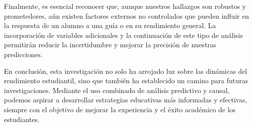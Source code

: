 Finalmente, es esencial reconocer que, aunque nuestros hallazgos son robustos y prometedores, aún existen factores externos no controlados que pueden influir en la respuesta de un alumno a una guía o en su rendimiento general. La incorporación de variables adicionales y la continuación de este tipo de análisis permitirán reducir la incertidumbre y mejorar la precisión de nuestras predicciones.

En conclusión, esta investigación no solo ha arrojado luz sobre las dinámicas del rendimiento estudiantil, sino que también ha establecido un camino para futuras investigaciones. Mediante el uso combinado de análisis predictivo y causal, podemos aspirar a desarrollar estrategias educativas más informadas y efectivas, siempre con el objetivo de mejorar la experiencia y el éxito académico de los estudiantes.
